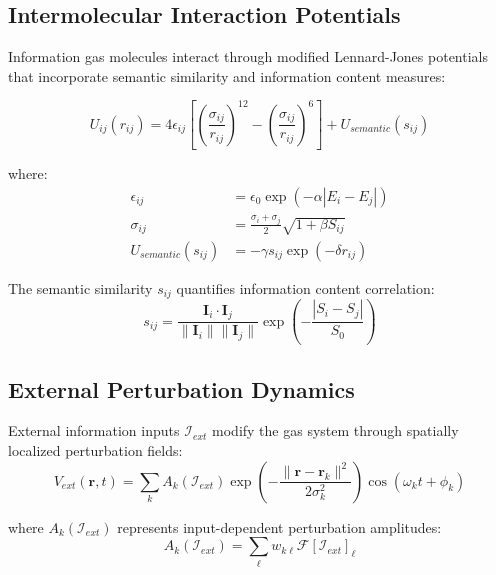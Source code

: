 \subsection{Intermolecular Interaction Potentials}

Information gas molecules interact through modified Lennard-Jones potentials that incorporate semantic similarity and information content measures:

\begin{equation}
U_{ij}(r_{ij}) = 4\epsilon_{ij}\left[\left(\frac{\sigma_{ij}}{r_{ij}}\right)^{12} - \left(\frac{\sigma_{ij}}{r_{ij}}\right)^6\right] + U_{semantic}(s_{ij})
\label{eq:interaction-potential}
\end{equation}

where:
\begin{align}
\epsilon_{ij} &= \epsilon_0 \exp(-\alpha |E_i - E_j|) \label{eq:epsilon-modulation} \\
\sigma_{ij} &= \frac{\sigma_i + \sigma_j}{2} \sqrt{1 + \beta S_{ij}} \label{eq:sigma-modulation} \\
U_{semantic}(s_{ij}) &= -\gamma s_{ij} \exp(-\delta r_{ij}) \label{eq:semantic-potential}
\end{align}

The semantic similarity $s_{ij}$ quantifies information content correlation:
\begin{equation}
s_{ij} = \frac{\mathbf{I}_i \cdot \mathbf{I}_j}{\|\mathbf{I}_i\| \|\mathbf{I}_j\|} \exp\left(-\frac{|S_i - S_j|}{S_0}\right)
\label{eq:semantic-similarity}
\end{equation}

\subsection{External Perturbation Dynamics}

External information inputs $\mathcal{I}_{ext}$ modify the gas system through spatially localized perturbation fields:
\begin{equation}
V_{ext}(\mathbf{r}, t) = \sum_{k} A_k(\mathcal{I}_{ext}) \exp\left(-\frac{\|\mathbf{r} - \mathbf{r}_k\|^2}{2\sigma_k^2}\right) \cos(\omega_k t + \phi_k)
\label{eq:external-perturbation}
\end{equation}

where $A_k(\mathcal{I}_{ext})$ represents input-dependent perturbation amplitudes:
\begin{equation}
A_k(\mathcal{I}_{ext}) = \sum_{\ell} w_{k\ell} \mathcal{F}[\mathcal{I}_{ext}]_\ell
\label{eq:perturbation-amplitude}
\end{equation}

